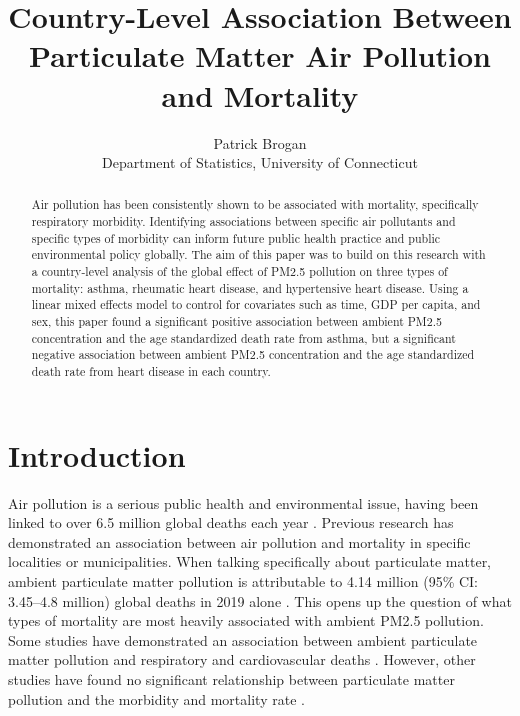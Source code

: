\documentclass[12pt, letterpaper, twoside]{article}\usepackage[]{graphicx}\usepackage[]{xcolor}
\title{Country-Level Association Between Particulate Matter Air Pollution and Mortality}
\author{Patrick Brogan\\[1ex]
  Department of Statistics, University of Connecticut\\}
\begin{document}
\maketitle

\begin{abstract}
Air pollution has been consistently shown to be associated with mortality,
specifically respiratory morbidity. Identifying associations between specific
air pollutants and specific types of morbidity can inform future public health
practice and public environmental policy globally. The aim of this paper was to
build on this research with a country-level analysis of the global effect of
PM2.5 pollution on three types of mortality: asthma, rheumatic heart disease,
and hypertensive heart disease. Using a linear mixed effects model to control
for covariates such as time, GDP per capita, and sex, this paper found a
significant positive association between ambient PM2.5 concentration and the age
standardized death rate from asthma, but a significant negative association
between ambient PM2.5 concentration and the age standardized death rate from
heart disease in each country.
\end{abstract}

\section*{Introduction}
Air pollution is a serious public health and environmental issue, having been
linked to over 6.5 million global deaths each year \citep{fuller2022pollution}.
Previous research has demonstrated an association between air pollution and
mortality in specific localities or municipalities\citep{dockery1993association,
sunyer1996air, jerrett2005spatial, analitis2006short}. When talking specifically
about particulate matter, ambient particulate matter pollution is attributable
to 4.14 million (95\% CI: 3.45–4.8 million) global deaths in 2019 alone
\citep{fuller2022pollution}. This opens up the question of what types of
mortality are most heavily associated with ambient PM2.5 pollution. Some studies
have demonstrated an association between ambient particulate matter pollution
and respiratory and cardiovascular deaths \citep{analitis2006short}. However,
other studies have found no significant relationship between particulate matter
pollution and the morbidity and mortality rate \citep{khojasteh2021long}.\par
\end{document}
